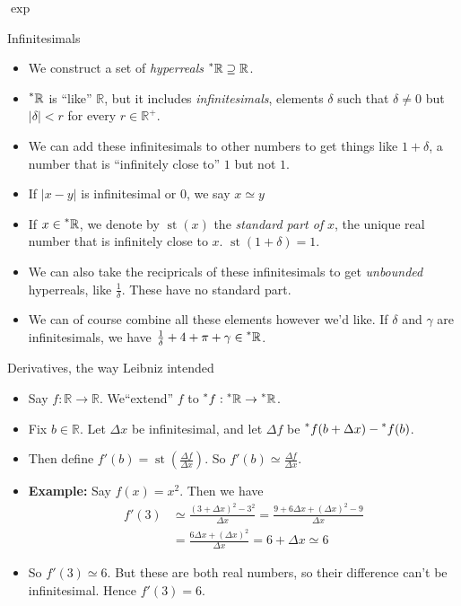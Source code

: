 \documentclass{beamer}
\theoremstyle{plain}
\theoremstyle{definition}
\newcommand{\stp}[1]{\st\left(#1\right)}
\newcommand{\reals}{\mathbb{R}}
\newcommand{\hreals}{\prescript{*}{}{\mathbb{R}}}
\newcommand{\hr}[1]{\prescript{*}{}{#1}}
\DeclareMathOperator{\st}{st}
\begin{document}
\begin{frame}{$\exp$}
\end{frame}

\begin{frame}{Infinitesimals}
\begin{itemize}
	\item We construct a set of \textit{hyperreals} $\hreals \supseteq \reals$.
	\item $\hreals$ is ``like'' $\reals$, but it includes \textit{infinitesimals}, elements $\delta$ such that $\delta \neq 0$ but $|\delta| < r$ for every $r \in \reals^+$.
	\item We can add these infinitesimals to other numbers to get things like $1 + \delta$, a number that is ``infinitely close to'' $1$ but not $1$. 
	\item If $|x - y|$ is infinitesimal or $0$, we say $x \simeq y$
	\item If $x \in \hreals$, we denote by $\st(x)$ the \textit{standard part of} $x$, the unique real number that is infinitely close to $x$. $\st(1 + \delta) = 1$. 
	\item We can also take the recipricals of these infinitesimals to get \textit{unbounded} hyperreals, like $\frac{1}{\delta}$. These have no standard part.
	\item We can of course combine all these elements however we'd like. If $\delta$ and $\gamma$ are infinitesimals, we have $\frac{1}{\delta} + 4 + \pi + \gamma \in \hreals$.
\end{itemize}
\end{frame}

\begin{frame}{Derivatives, the way Leibniz intended}
\begin{itemize}
	\item Say $f: \reals \to \reals$. We``extend'' $f$ to $\hr{f}: \hreals \to \hreals$.
	\item Fix $b \in \reals$. Let $\Delta x$ be infinitesimal, and let $\Delta f$ be $\hr{f}(b + \Delta x) - \hr{f}(b)$.
	\item Then define $f'(b) = \stp{\frac{\Delta f}{\Delta x}}$. So $f'(b) \simeq \frac{\Delta f}{\Delta x}$.
	\item \textbf{Example:} Say $f(x) = x^2$. Then we have 
	\begin{align*}
	f'(3) &\simeq \frac{(3 + \Delta x)^2 - 3^2}{\Delta x} = \frac{9 + 6 \Delta x + (\Delta x)^2 - 9}{\Delta x} \\
		&= \frac{6 \Delta x + (\Delta x)^2}{\Delta x} = 6 + \Delta x \simeq 6
	\end{align*}
	\item So $f'(3) \simeq 6$. But these are both real numbers, so their difference can't be infinitesimal. Hence $f'(3) = 6$.
\end{itemize}
\end{frame}
\end{document}
